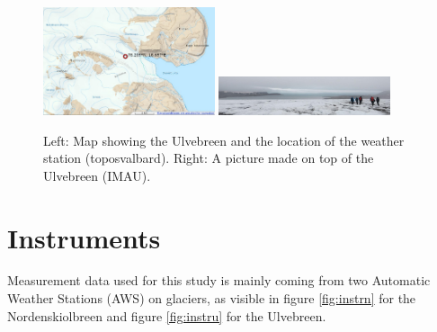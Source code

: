 \documentclass[11pt]{report}
\begin{document}
\begin{figure}[h]
\includegraphics[scale=1, width=0.45\textwidth]{ulvemap.jpg}
\includegraphics[scale=1, width=0.45\textwidth]{view2.jpg}
\centering{}
\caption{Left: Map showing the Ulvebreen and the location of the weather station (toposvalbard). Right: A picture made on top of the Ulvebreen (IMAU).}
\label{fig:ulve}
\end{figure}

\newpage
\section{Instruments}\label{sec:instr}
Measurement data used for this study is mainly coming from two Automatic Weather Stations (AWS) on glaciers, as visible in figure \ref{fig:instrn} for the Nordenskiolbreen and figure \ref{fig:instru} for the Ulvebreen.
\end{document}
